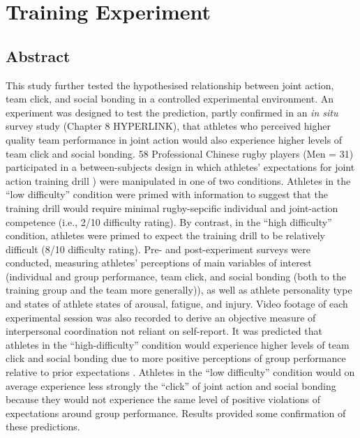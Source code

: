 \chapter{\label{9trainingExperiment}Training Experiment}

\minitoc


\section{Abstract}
This study further tested the hypothesised relationship between joint action, team click, and social bonding in a controlled experimental environment.  An experiment was designed to test the prediction, partly confirmed in an \textit{in situ} survey study (Chapter 8 HYPERLINK), that athletes who perceived higher quality team performance in joint action would also experience higher levels of team click and social bonding.  58 Professional Chinese rugby players (Men = 31) participated in a between-subjects design in which athletes' expectations for joint action training drill \citep[``Invasion drill''][]{Passos2011}) were manipulated in one of two conditions.  Athletes in the ``low difficulty'' condition were primed with information to suggest that the training drill would require minimal rugby-sepcific individual and joint-action competence (i.e., 2/10 difficulty rating).  By contrast, in the ``high difficulty'' condition, athletes were primed to expect the training drill to be relatively difficult (8/10 difficulty rating). Pre- and post-experiment surveys were conducted, measuring athletes' perceptions of main variables of interest (individual and group performance, team click, and social bonding (both to the training group and the team more generally)), as well as athlete personality type and states of athlete states of arousal, fatigue, and injury.  Video footage of each experimental session was also recorded to derive an objective measure of interpersonal coordination not reliant on self-report. It was predicted that athletes in the ``high-difficulty'' condition would experience higher levels of team click and social bonding due to more positive perceptions of group performance relative to prior expectations .  Athletes in the ``low difficulty'' condition would on average experience less strongly the ``click'' of joint action and social bonding because they would not experience the same level of positive violations of expectations around group performance.  Results provided some confirmation of these predictions.


